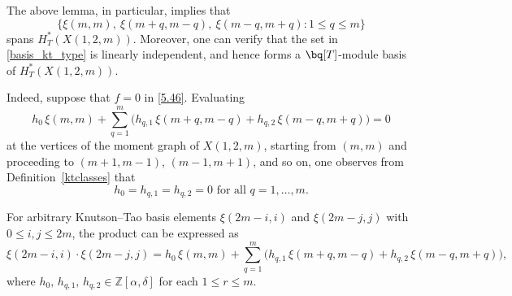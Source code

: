 \documentclass[10pt, a4paper, reqno]{amsart}
\begin{document}
	\begin{rema}\label{ktclass_indep}
The above lemma, in particular, implies that  
\begin{equation}\label{basis_kt_type}
	\Big\{\xi(m,m),~\xi(m+q,m-q),~\xi(m-q,m+q) : 1 \le q \le m\Big\}
\end{equation}
spans $H_T^*(X(1,2,m))$. Moreover, one can verify that the set in \eqref{basis_kt_type} is linearly independent, and hence forms a $\bq[T]$-module basis of $H_T^*(X(1,2,m))$.

		Indeed, suppose that $f = 0$ in \eqref{5.46}. Evaluating 
		\[
		h_0\,\xi(m,m) + \sum_{q=1}^{m} \big( h_{q,1}\,\xi(m+q,m-q) + h_{q,2}\,\xi(m-q,m+q) \big)=0
		\]
		at the vertices of the moment graph of $X(1,2,m)$, starting from $(m,m)$ and proceeding to $(m+1,m-1)$, $(m-1,m+1)$, and so on, 
		one observes from Definition~\ref{ktclasses} that 
		\[h_0 = h_{q,1} = h_{q,2} = 0 \text{ for all $q = 1, \ldots, m$.}\]
	\end{rema}
	
	
	\begin{guess}\label{Theo:strconsts}
		For arbitrary Knutson--Tao basis elements 
		$\xi(2m-i,i)$ and $\xi(2m-j,j)$ with $0 \leq i,j \leq 2m$, 
		the product can be expressed as
		\[
	\xi(2m-i,i)\cdot \xi(2m-j,j)= h_0 \, \xi(m,m) 
		+ \sum_{q=1}^{m} \big( h_{q,1} \, \xi(m+q,m-q) 
		+ h_{q,2} \, \xi(m-q,m+q) \big),
		\]
		where $ h_0,\, h_{q,1},\, h_{q,2} \in \mathbb{Z}[\alpha,\delta] $ for each $ 1 \le r \le m $.
	\end{guess}
	
\end{document}
